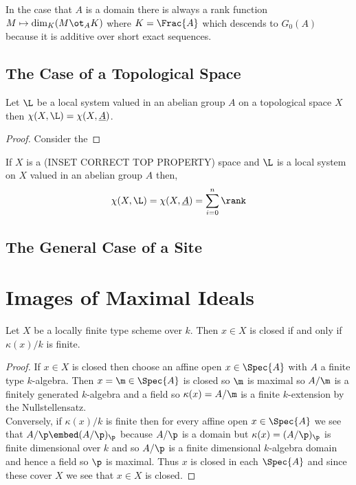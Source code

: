 \documentclass[12pt]{article}
\begin{document}
\begin{rmk}
In the case that $A$ is a domain there is always a rank function $M \mapsto \dim_K (M \ot_A K)$ where $K = \Frac{A}$ which descends to $G_0(A)$ because it is additive over short exact sequences.
\end{rmk}

\subsection{The Case of a Topological Space}

\begin{prop}

\end{prop}


\begin{prop}
Let $\L$ be a local system valued in an abelian group $A$ on a topological space $X$ then $\chi(X, \L) = \chi(X, \underline{A})$. 
\end{prop}

\begin{proof}
Consider the 
\end{proof}

\begin{cor}
If $X$ is a (INSET CORRECT TOP PROPERTY) space and $\L$ is a local system on $X$ valued in an abelian group $A$ then,
\[ \chi(X, \L) = \chi(X, \underline{A}) = \sum_{i = 0}^{n} \rank \]
\end{cor}

\subsection{The General Case of a Site}



\section{Images of Maximal Ideals}

\begin{lemma}
Let $X$ be a locally finite type scheme over $k$. Then $x \in X$ is closed if and only if $\kappa(x) / k$ is finite. 
\end{lemma}

\begin{proof}
If $x \in X$ is closed then choose an affine open $x \in \Spec{A}$ with $A$ a finite type $k$-algebra. Then $x = \m \in \Spec{A}$ is closed so $\m$ is maximal so $A / \m$ is a finitely generated $k$-algebra and a field so $\kappa(x) = A /\m$ is a finite $k$-extension by the Nullstellensatz. 
\bigskip\\
Conversely, if $\kappa(x) / k$ is finite then for every affine open $x \in \Spec{A}$ we see that $A / \p \embed (A / \p)_\p$ because $A / \p$ is a domain but $\kappa(x) = (A / \p)_\p$ is finite dimensional over $k$ and so $A / \p$ is a finite dimensional $k$-algebra domain and hence a field so $\p$ is maximal. Thus $x$ is closed in each $\Spec{A}$ and since these cover $X$ we see that $x \in X$ is closed.
\end{proof}
\end{document}
